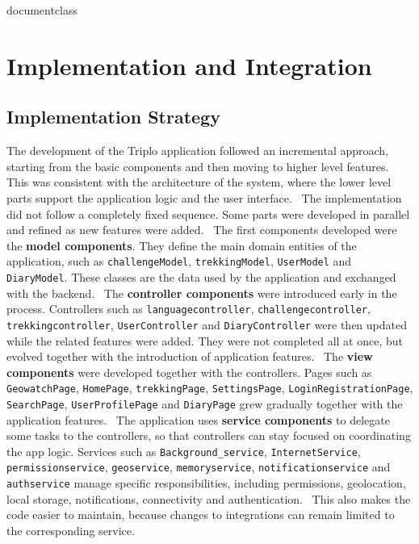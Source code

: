 \csname documentclass



\chapter{Implementation and Integration} \label{Implementation and Integration}

\section{Implementation Strategy}
The development of the Triplo application followed an incremental approach, starting from the basic components and then moving to higher level features. This was consistent with the architecture of the system, where the lower level parts support the application logic and the user interface. \
The implementation did not follow a completely fixed sequence. Some parts were developed in parallel and refined as new features were added. \
The first components developed were the \textbf{model components}. They define the main domain entities of the application, such as \texttt{challengeModel}, \texttt{trekkingModel}, \texttt{UserModel} and \texttt{DiaryModel}. These classes are  the data used by the application and exchanged with the backend. \
The \textbf{controller components} were introduced early in the process. Controllers such as \texttt{languagecontroller}, \texttt{challengecontroller}, \texttt{trekkingcontroller}, \texttt{UserController} and \texttt{DiaryController} were then updated while the related features were added. They were not completed all at once, but evolved together  with the introduction of application features. \
The \textbf{view components} were developed together with the controllers. Pages such as \texttt{GeowatchPage}, \texttt{HomePage}, \texttt{trekkingPage}, \texttt{SettingsPage}, \texttt{LoginRegistrationPage}, \texttt{SearchPage}, \texttt{UserProfilePage} and \texttt{DiaryPage} grew gradually together with the application features. \
The application uses \textbf{service components} to delegate some tasks to  the controllers, so that controllers can stay focused on coordinating the app logic. Services such as \texttt{Background\_service}, \texttt{InternetService}, \texttt{permissionservice}, \texttt{geoservice}, \texttt{memoryservice}, \texttt{notificationservice} and \texttt{authservice} manage specific responsibilities, including permissions, geolocation, local storage, notifications, connectivity and authentication. \
This also makes the code easier to maintain, because changes to integrations can remain limited to the corresponding service.


